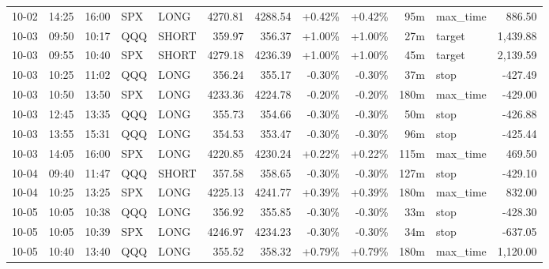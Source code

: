 \documentclass[11pt,a4paper,twoside]{article}
\begin{document}
\begin{center}
\begin{longtable}{>{\color{txtmain}}l l l l l r r r r r >{\color{txtmain}}l r}
10-02 & 14:25 & 16:00 & SPX & LONG & 4270.81 & 4288.54 & \textcolor{wingreen}{+0.42\%} & \textcolor{wingreen}{+0.42\%} & 95m & max\_time & \textcolor{wingreen}{886.50} \\
10-03 & 09:50 & 10:17 & QQQ & SHORT & 359.97 & 356.37 & \textcolor{wingreen}{+1.00\%} & \textcolor{wingreen}{+1.00\%} & 27m & target & \textcolor{wingreen}{1,439.88} \\
10-03 & 09:55 & 10:40 & SPX & SHORT & 4279.18 & 4236.39 & \textcolor{wingreen}{+1.00\%} & \textcolor{wingreen}{+1.00\%} & 45m & target & \textcolor{wingreen}{2,139.59} \\
10-03 & 10:25 & 11:02 & QQQ & LONG & 356.24 & 355.17 & \textcolor{lossred}{-0.30\%} & \textcolor{lossred}{-0.30\%} & 37m & stop & \textcolor{lossred}{-427.49} \\
10-03 & 10:50 & 13:50 & SPX & LONG & 4233.36 & 4224.78 & \textcolor{lossred}{-0.20\%} & \textcolor{lossred}{-0.20\%} & 180m & max\_time & \textcolor{lossred}{-429.00} \\
10-03 & 12:45 & 13:35 & QQQ & LONG & 355.73 & 354.66 & \textcolor{lossred}{-0.30\%} & \textcolor{lossred}{-0.30\%} & 50m & stop & \textcolor{lossred}{-426.88} \\
10-03 & 13:55 & 15:31 & QQQ & LONG & 354.53 & 353.47 & \textcolor{lossred}{-0.30\%} & \textcolor{lossred}{-0.30\%} & 96m & stop & \textcolor{lossred}{-425.44} \\
10-03 & 14:05 & 16:00 & SPX & LONG & 4220.85 & 4230.24 & \textcolor{wingreen}{+0.22\%} & \textcolor{wingreen}{+0.22\%} & 115m & max\_time & \textcolor{wingreen}{469.50} \\
10-04 & 09:40 & 11:47 & QQQ & SHORT & 357.58 & 358.65 & \textcolor{lossred}{-0.30\%} & \textcolor{lossred}{-0.30\%} & 127m & stop & \textcolor{lossred}{-429.10} \\
10-04 & 10:25 & 13:25 & SPX & LONG & 4225.13 & 4241.77 & \textcolor{wingreen}{+0.39\%} & \textcolor{wingreen}{+0.39\%} & 180m & max\_time & \textcolor{wingreen}{832.00} \\
10-05 & 10:05 & 10:38 & QQQ & LONG & 356.92 & 355.85 & \textcolor{lossred}{-0.30\%} & \textcolor{lossred}{-0.30\%} & 33m & stop & \textcolor{lossred}{-428.30} \\
10-05 & 10:05 & 10:39 & SPX & LONG & 4246.97 & 4234.23 & \textcolor{lossred}{-0.30\%} & \textcolor{lossred}{-0.30\%} & 34m & stop & \textcolor{lossred}{-637.05} \\
10-05 & 10:40 & 13:40 & QQQ & LONG & 355.52 & 358.32 & \textcolor{wingreen}{+0.79\%} & \textcolor{wingreen}{+0.79\%} & 180m & max\_time & \textcolor{wingreen}{1,120.00} \\

\end{longtable}
\end{center}
\end{document}

